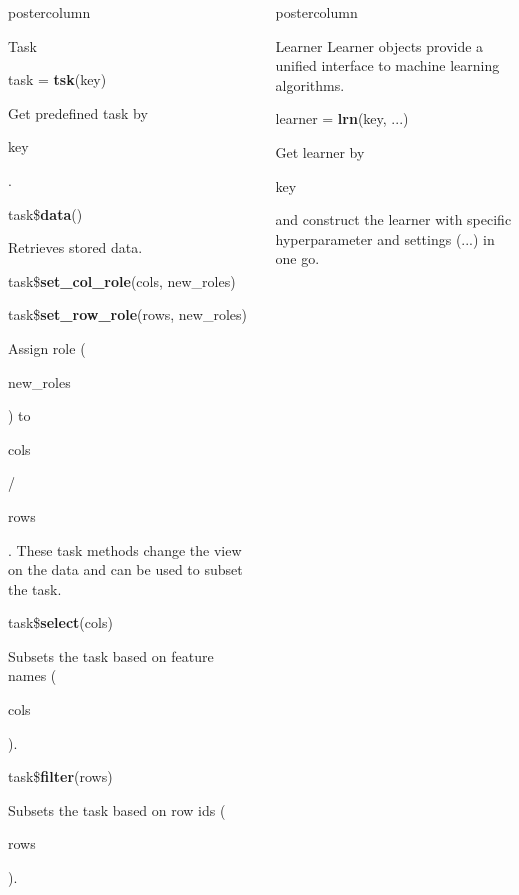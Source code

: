 \documentclass{beamer}
\newlength{\columnheight} %
\newcommand{\codeinline}[1]{\begin{codeboxinline}#1\end{codeboxinline}}
\begin{document}
\begin{frame}[fragile]{}
\begin{columns}
\begin{column}{.245\textwidth}
\begin{beamercolorbox}[center]{postercolumn}
\begin{minipage}{.98\textwidth}
{\begin{myblock}{Task}
\begin{codebox}
								task = \textbf{tsk}(key)
							\end{codebox}
							Get predefined task by \codeinline{key}.
							\\
							\begin{codebox}
								task\$\textbf{data}()
							\end{codebox}
							Retrieves stored data.
							\\
							\begin{codebox}
								task\$\textbf{set\_col\_role}(cols, new\_roles)
							\end{codebox}
							\begin{codebox}
								task\$\textbf{set\_row\_role}(rows, new\_roles)
							\end{codebox}
							Assign role (\codeinline{new\_roles}) to \codeinline{cols} / \codeinline{rows}. These task methods change the view on the data and can be used to subset the task.
							\\
							\begin{codebox}
								task\$\textbf{select}(cols)
							\end{codebox}
							Subsets the task based on feature names (\codeinline{cols}).
							\\
							\begin{codebox}
								task\$\textbf{filter}(rows)
							\end{codebox}
							Subsets the task based on row ids (\codeinline{rows}).
						\end{myblock}
						\vfill
					}
				\end{minipage}
			\end{beamercolorbox}
		\end{column}
		\begin{column}{.245\textwidth}
			\begin{beamercolorbox}[center]{postercolumn}
				\begin{minipage}{.98\textwidth}
					\parbox[t][\columnheight]{\textwidth}{
						\begin{myblock}{Learner}
							Learner objects provide a unified interface to machine learning algorithms.
							\\
							\begin{codebox}
								learner = \textbf{lrn}(key, ...)
							\end{codebox}
							Get learner by \codeinline{key} and construct the learner with specific hyperparameter and settings (...) in one go.
							\\
							\begin{codebox}

\end{codebox}
\end{myblock}}
\end{minipage}
\end{beamercolorbox}
\end{column}
\end{columns}
\end{frame}
\end{document}

